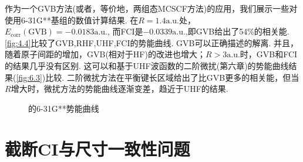 \exercise{}


作为一个GVB方法(或者，等价地，两组态MCSCF方法)的应用，我们展示一些对使用6-31G**基组的数值计算结果.
在$R=1.4\text{a.u.}$处，
$E_{\text{corr}}(\text{GVB})= -0.0183\text{a.u.}$,
而FCI是$ -0.0339\text{a.u.}$,即GVB给出了54\%的相关能.
\autoref{fig:4.4}比较了GVB,RHF,UHF,FCI的势能曲线.
GVB可以正确描述的解离.
并且，随着原子间距的增加，GVB(相对于HF)的改进也增大；$R>3\text{a.u.}$时，GVB和FCI的结果几乎没有区别.
这可以和基于UHF波函数的二阶微扰(第六章)的势能曲线结果(\autoref{fig:6.3})比较.
二阶微扰方法在平衡键长区域给出了比GVB更多的相关能，但当$R$增大时，微扰方法的势能曲线逐渐变差，趋近于UHF的结果.

\begin{figure}[H]
	\caption{的6-31G**势能曲线}
\label{fig:4.4}
\end{figure}

\section{截断CI与尺寸一致性问题}
\label{sec4.6}




\theendnotes
